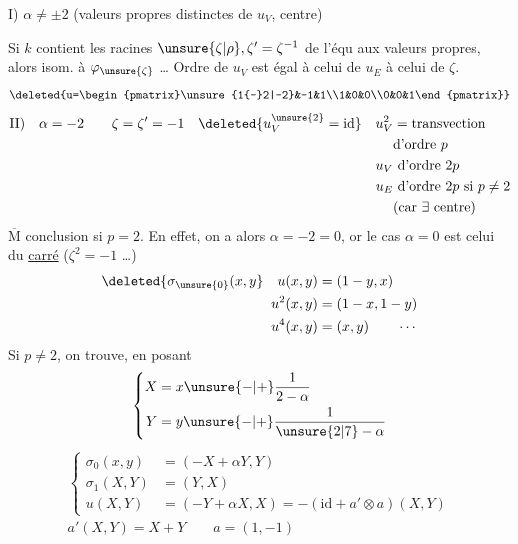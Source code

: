 I) $\alpha\ne\pm2$ \quad (valeurs propres distinctes de $u_V$,  centre)

Si $k$ contient les racines $\unsure{\zeta|\rho},\zeta'=\zeta^{-1}$ de l'équ aux valeurs propres, alors  isom. à \deleted{$\Pi_\zeta$} $\varphi_{\unsure{\zeta}}$ \dots{} Ordre de $u_V$ est égal à celui de $u_E$  à celui de $\zeta$.
  
\[
\deleted{u=\begin{pmatrix}\unsure{1{-}2|-2}&-1&1\\1&0&0\\0&0&1\end{pmatrix}}
\]
\[
\begin{aligned}
\text{II)}\quad\alpha&=-2\qquad \zeta=\zeta'=-1&
\deleted{u_V^{\unsure{2}}=\mathrm{id}}\quad u_V^2&=\text{transvection}\\
&&&\text{d'ordre }p\\
&&u_V&\ \text{d'ordre }2p\\
&&u_E&\ \text{d'ordre }2p\text{ si }p\ne2\\
&&&(\text{car }\exists\text{ centre})
\end{aligned}
\]
$\overline{\mathrm M}$ conclusion si $p=2$. En effet, on a alors $\alpha=-2=0$, or le cas $\alpha=0$ est celui du \uline{carré} ($\zeta^2=-1$ \dots)
\[
\begin{aligned}
\deleted{\sigma_{\unsure{0}}(x,y}\quad u(x,y)&=(1-y,x)\\
u^2(x,y)&=(1-x,1-y)\\
u^4(x,y)&=(x,y)\qquad\cdots
\end{aligned}
\]
Si $p\ne2$,  on trouve, en posant
\[
\left\{\begin{aligned}X&=x\unsure{-|+}\frac{1}{2-\alpha}\\Y&=y\unsure{-|+}\frac{1}{\unsure{2|7}-\alpha}\end{aligned}\right.
\]
\[
\begin{aligned}
\left\{\begin{aligned}\sigma_0(x,y)&=(-X+\alpha Y,Y)\\\sigma_1(X,Y)&=(Y,X)\\u(X,Y)&=(-Y+\alpha X,X)=-(\mathrm{id}+a'\otimes a)(X,Y)\end{aligned}\right.\\
a'(X,Y)=X+Y\qquad a=(1,-1)
\end{aligned}
\]
